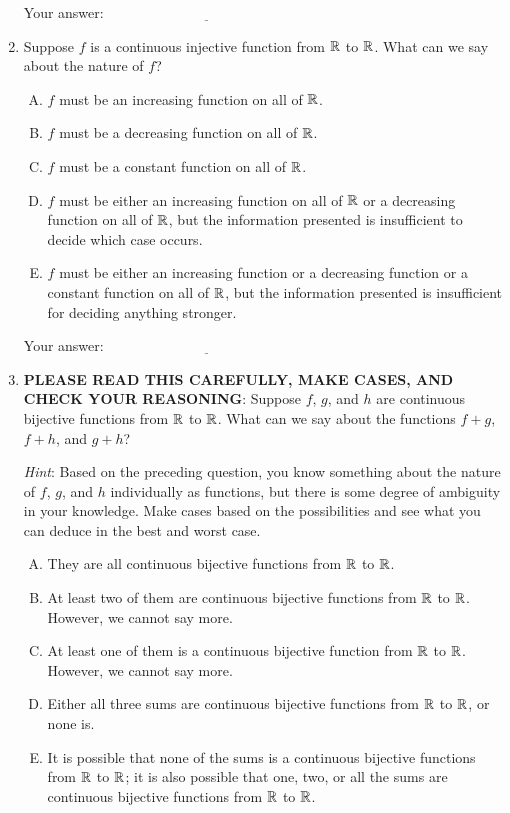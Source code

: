\documentclass[10pt]{amsart}
\begin{document}
\begin{enumerate}
  \vspace{0.1in}
  Your answer: $\underline{\qquad\qquad\qquad\qquad\qquad\qquad\qquad}$
  \vspace{0.1in}

\item Suppose $f$ is a continuous injective function from $\mathbb{R}$ to
  $\mathbb{R}$. What can we say about the nature of $f$?

  \begin{enumerate}[(A)]
  \item $f$ must be an increasing function on all of $\mathbb{R}$.
  \item $f$ must be a decreasing function on all of $\mathbb{R}$.
  \item $f$ must be a constant function on all of $\mathbb{R}$.
  \item $f$ must be either an increasing function on all of $\mathbb{R}$ or a
    decreasing function on all of $\mathbb{R}$, but the information presented
    is insufficient to decide which case occurs.
  \item $f$ must be either an increasing function or a decreasing
    function or a constant function on all of $\mathbb{R}$, but the
    information presented is insufficient for deciding anything
    stronger.
  \end{enumerate}

  \vspace{0.1in}
  Your answer: $\underline{\qquad\qquad\qquad\qquad\qquad\qquad\qquad}$
  \vspace{0.1in}

\item {\bf PLEASE READ THIS CAREFULLY, MAKE CASES, AND CHECK YOUR
  REASONING}: Suppose $f$, $g$, and $h$ are continuous bijective
  functions from $\mathbb{R}$ to $\mathbb{R}$. What can we say about the functions $f
  + g$, $f + h$, and $g + h$?

  {\em Hint}: Based on the preceding question, you know something
  about the nature of $f$, $g$, and $h$ individually as functions, but
  there is some degree of ambiguity in your knowledge. Make cases
  based on the possibilities and see what you can deduce in the best
  and worst case.

  \begin{enumerate}[(A)]
  \item They are all continuous bijective functions from $\mathbb{R}$ to $\mathbb{R}$.
  \item At least two of them are continuous bijective functions from
    $\mathbb{R}$ to $\mathbb{R}$. However, we cannot say more.
  \item At least one of them is a continuous bijective function from
    $\mathbb{R}$ to $\mathbb{R}$. However, we cannot say more.
  \item Either all three sums are continuous bijective functions from
    $\mathbb{R}$ to $\mathbb{R}$, or none is.
  \item It is possible that none of the sums is a continuous
    bijective functions from $\mathbb{R}$ to $\mathbb{R}$; it is
    also possible that one, two, or all the sums are continuous
    bijective functions from $\mathbb{R}$ to $\mathbb{R}$.
  \end{enumerate}


\end{enumerate}
\end{document}
